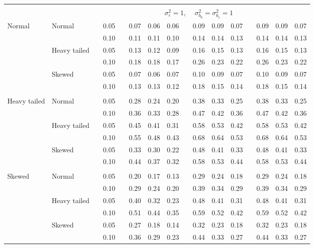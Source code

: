 \documentclass[11pt]{article} %
\begin{document}
\begin{table}[ht]
\begin{scriptsize}
\begin{center}
\begin{tabular}{ll p{.1cm} c p{.1cm} rrr p{.1cm} rrr p{.1cm} rrr}
&&&&&&&&&&&&&&&\\
& && && \multicolumn{9}{c}{$\sigma_{\varepsilon}^2 = 1$, \ \ $\sigma_{b_0}^2 = \sigma_{b_1}^2 = 1$} \\ \cline{6-16}
Normal       & Normal       && 0.05 &&   0.07 & 0.06 & 0.06 && 0.09 & 0.09 & 0.07 && 0.09 & 0.09 & 0.07 \\ 
             &              && 0.10 &&   0.11 & 0.11 & 0.10 && 0.14 & 0.14 & 0.13 && 0.14 & 0.14 & 0.13 \\ 
             & Heavy tailed && 0.05 &&   0.13 & 0.12 & 0.09 && 0.16 & 0.15 & 0.13 && 0.16 & 0.15 & 0.13 \\ 
             &              && 0.10 &&   0.18 & 0.18 & 0.17 && 0.26 & 0.23 & 0.22 && 0.26 & 0.23 & 0.22 \\ 
             & Skewed       && 0.05 &&   0.07 & 0.06 & 0.07 && 0.10 & 0.09 & 0.07 && 0.10 & 0.09 & 0.07 \\ 
             &              && 0.10 &&   0.13 & 0.13 & 0.12 && 0.18 & 0.15 & 0.14 && 0.18 & 0.15 & 0.14 \\ 
             &&&&&&&&&&&&&&&\\
Heavy tailed & Normal       && 0.05 &&   0.28 & 0.24 & 0.20 && 0.38 & 0.33 & 0.25 && 0.38 & 0.33 & 0.25 \\ 
             &              && 0.10 &&   0.36 & 0.33 & 0.28 && 0.47 & 0.42 & 0.36 && 0.47 & 0.42 & 0.36 \\ 
             & Heavy tailed && 0.05 &&   0.45 & 0.41 & 0.31 && 0.58 & 0.53 & 0.42 && 0.58 & 0.53 & 0.42 \\ 
             &              && 0.10 &&   0.55 & 0.48 & 0.43 && 0.68 & 0.64 & 0.53 && 0.68 & 0.64 & 0.53 \\ 
             & Skewed       && 0.05 &&   0.33 & 0.30 & 0.22 && 0.48 & 0.41 & 0.33 && 0.48 & 0.41 & 0.33 \\ 
             &              && 0.10 &&   0.44 & 0.37 & 0.32 && 0.58 & 0.53 & 0.44 && 0.58 & 0.53 & 0.44 \\ 
             &&&&&&&&&&&&&&&\\
Skewed       & Normal       && 0.05 &&   0.20 & 0.17 & 0.13 && 0.29 & 0.24 & 0.18 && 0.29 & 0.24 & 0.18 \\ 
             &              && 0.10 &&   0.29 & 0.24 & 0.20 && 0.39 & 0.34 & 0.29 && 0.39 & 0.34 & 0.29 \\ 
             & Heavy tailed && 0.05 &&   0.40 & 0.32 & 0.23 && 0.48 & 0.41 & 0.31 && 0.48 & 0.41 & 0.31 \\ 
             &              && 0.10 &&   0.51 & 0.44 & 0.35 && 0.59 & 0.52 & 0.42 && 0.59 & 0.52 & 0.42 \\ 
             & Skewed       && 0.05 &&   0.27 & 0.18 & 0.14 && 0.32 & 0.23 & 0.18 && 0.32 & 0.23 & 0.18 \\ 
             &              && 0.10 &&   0.36 & 0.29 & 0.23 && 0.44 & 0.33 & 0.27 && 0.44 & 0.33 & 0.27 \\ 



\end{tabular}
\end{center}
\end{scriptsize}
\end{table}
\end{document}
